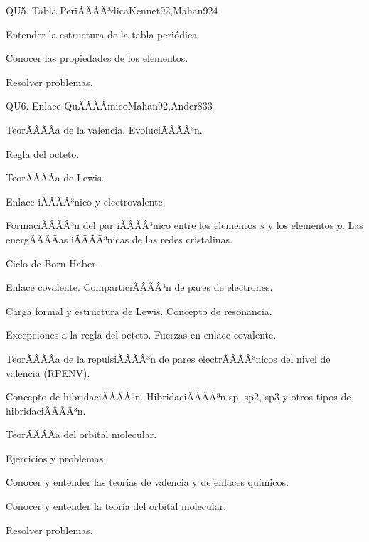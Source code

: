 \begin{sumilla}
\begin{unit}{QU5. Tabla PeriÃÂÃÂ³dica}{Kennet92,Mahan92}{4}
   \begin{objetivos}
      \item Entender la estructura de la tabla peri\'odica.
      \item Conocer las propiedades de los elementos.
      \item Resolver problemas.
   \end{objetivos}
\end{unit}

\begin{unit}{QU6. Enlace QuÃÂÃÂ­mico}{Mahan92,Ander83}{3}
   \begin{topicos}
	\item TeorÃÂÃÂ­a de  la valencia. EvoluciÃÂÃÂ³n.
	\item Regla del octeto.
	\item TeorÃÂÃÂ­a de Lewis.
	\item Enlace iÃÂÃÂ³nico y electrovalente.
	\item FormaciÃÂÃÂ³n del par iÃÂÃÂ³nico entre los elementos $s$ y los elementos $p$. Las energÃÂÃÂ­as iÃÂÃÂ³nicas de las redes cristalinas.
	\item Ciclo de Born Haber.
	\item Enlace covalente. ComparticiÃÂÃÂ³n de pares de electrones.
	\item Carga formal y estructura de Lewis. Concepto de resonancia.
	\item Excepciones a la regla del octeto. Fuerzas en enlace covalente.
	\item TeorÃÂÃÂ­a de la repulsiÃÂÃÂ³n de pares electrÃÂÃÂ³nicos del nivel de valencia (RPENV).
	\item Concepto de hibridaciÃÂÃÂ³n. HibridaciÃÂÃÂ³n sp, sp2, sp3 y otros tipos de hibridaciÃÂÃÂ³n.
	\item TeorÃÂÃÂ­a del orbital molecular.
	\item Ejercicios y problemas.
   \end{topicos}

   \begin{objetivos}
      \item Conocer y entender las teor\'ias de valencia y de enlaces qu\'imicos.
      \item Conocer y entender la teor\'ia del orbital molecular.
      \item Resolver problemas.
   \end{objetivos}
\end{unit}


\end{sumilla}
